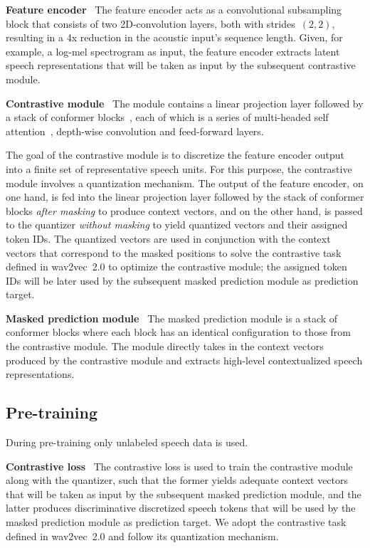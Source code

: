 \documentclass{article}
\begin{document}
\newcommand{\myparagraph}[1]{\vspace{.4em} \noindent \textbf{#1}\ }
\myparagraph{Feature encoder}
The feature encoder acts as a convolutional subsampling block that consists of two 2D-convolution layers, both with strides~$(2, 2)$, resulting in a 4x reduction in the acoustic input's sequence length.
Given, for example, a log-mel spectrogram as input, the feature encoder extracts latent speech representations that will be taken as input by the subsequent contrastive module.

\myparagraph{Contrastive module}
The module contains a linear projection layer followed by a stack of conformer blocks~\cite{gulati2020conformer}, each of which is a series of multi-headed self attention~\cite{vaswani2017attention}, depth-wise convolution and feed-forward layers.

The goal of the contrastive module is to discretize the feature encoder output into a finite set of representative speech units.
For this purpose, the contrastive module involves a quantization mechanism.
The output of the feature encoder, on one hand, is fed into the linear projection layer followed by the stack of conformer blocks {\it after masking} to produce context vectors, and on the other hand, is passed to the quantizer {\it without masking} to yield quantized vectors and their assigned token IDs.
The quantized vectors are used in conjunction with the context vectors that correspond to the masked positions to solve the contrastive task defined in wav2vec~2.0 to optimize the contrastive module; the assigned token IDs will be later used by the subsequent masked prediction module as prediction target.

\myparagraph{Masked prediction module}
The masked prediction module is a stack of conformer blocks where each block has an identical configuration to those from the contrastive module.
The module directly takes in the context vectors produced by the contrastive module and extracts high-level contextualized speech representations.

\subsection{Pre-training}
During pre-training only unlabeled speech data is used.

\myparagraph{Contrastive loss}
The contrastive loss is used to train the contrastive module along with the quantizer, such that the former yields adequate context vectors that will be taken as input by the subsequent masked prediction module, and the latter produces discriminative discretized speech tokens that will be used by the masked prediction module as prediction target.
We adopt the contrastive task defined in wav2vec~2.0 and follow its quantization mechanism.
\end{document}
